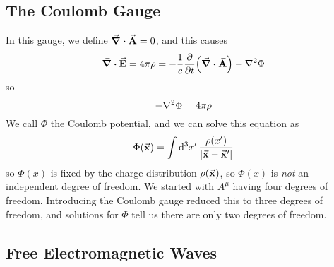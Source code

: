 \documentclass[a4paper,twoside,master.tex]{subfiles}
\begin{document}
\subsection{The Coulomb Gauge}\label{sub:the_coulomb_gauge}

In this gauge, we define $ \div{\va{A}} = 0 $, and this causes
\begin{equation}
    \div{\va{E}} = 4 \pi \rho = - \frac{1}{c} \pdv{t}(\div{\va{A}}) - \laplacian{\Phi}
\end{equation}
so
\begin{equation}
    - \laplacian{\Phi} = 4 \pi \rho
\end{equation}
We call $ \Phi $ the Coulomb potential, and we can solve this equation as
\begin{equation}
    \Phi(\va{x}) = \int \dd[3]{x'} \frac{\rho(x')}{\abs{\va{x} - \va{x}'}}
\end{equation}
so $ \Phi(x) $ is fixed by the charge distribution $ \rho(\va{x}) $, so $ \Phi(x) $ is \textit{not} an independent degree of freedom. We started with $ A^{\mu} $ having four degrees of freedom. Introducing the Coulomb gauge reduced this to three degrees of freedom, and solutions for $ \Phi $ tell us there are only two degrees of freedom.

\subsection{Free Electromagnetic Waves}\label{sub:free_electromagnetic_waves}
\end{document}
